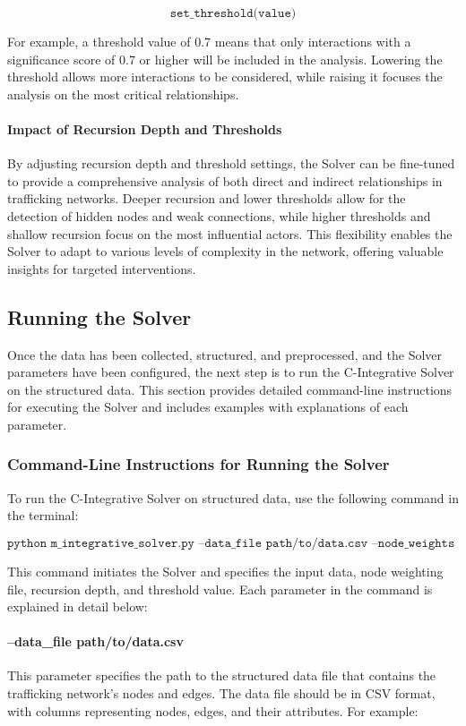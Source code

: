 \documentclass[%
 preprint, linenumbers,
 amsmath,amssymb,
 aps, physrev,
]{revtex4-2}
\begin{document}
\[
\texttt{set\_threshold(value)}
\]

For example, a threshold value of 0.7 means that only interactions with a significance score of 0.7 or higher will be included in the analysis. Lowering the threshold allows more interactions to be considered, while raising it focuses the analysis on the most critical relationships.

\paragraph{Impact of Recursion Depth and Thresholds}
By adjusting recursion depth and threshold settings, the Solver can be fine-tuned to provide a comprehensive analysis of both direct and indirect relationships in trafficking networks. Deeper recursion and lower thresholds allow for the detection of hidden nodes and weak connections, while higher thresholds and shallow recursion focus on the most influential actors. This flexibility enables the Solver to adapt to various levels of complexity in the network, offering valuable insights for targeted interventions.

\subsection{Running the Solver}

Once the data has been collected, structured, and preprocessed, and the Solver parameters have been configured, the next step is to run the C-Integrative Solver on the structured data. This section provides detailed command-line instructions for executing the Solver and includes examples with explanations of each parameter.

\subsubsection{Command-Line Instructions for Running the Solver}

To run the C-Integrative Solver on structured data, use the following command in the terminal:

\[
\texttt{python m\_integrative\_solver.py --data\_file path/to/data.csv --node\_weights weights.csv --recursion\_depth 5 --threshold 0.7}
\]

This command initiates the Solver and specifies the input data, node weighting file, recursion depth, and threshold value. Each parameter in the command is explained in detail below:

\paragraph{--data\_file path/to/data.csv}
This parameter specifies the path to the structured data file that contains the trafficking network’s nodes and edges. The data file should be in CSV format, with columns representing nodes, edges, and their attributes. For example:
\end{document}
